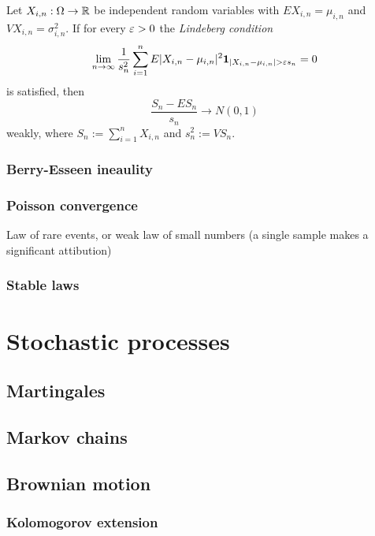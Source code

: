 \documentclass{../note}
\begin{document}
\begin{prb}
Let $X_{i,n}:\Omega\to\mathbb{R}$ be independent random variables with $EX_{i,n}=\mu_{i,n}$ and $VX_{i,n}=\sigma_{i,n}^2$.
If for every $\varepsilon>0$ the \emph{Lindeberg condition}
\[\lim_{n\to\infty}\frac1{s_n^2}\sum_{i=1}^nE|X_{i,n}-\mu_{i,n}|^2\1_{|X_{i,n}-\mu_{i,n}|>\e s_n}=0\]
is satisfied, then
\[\frac{S_n-ES_n}{s_n}\to N(0,1)\]
weakly, where $S_n:=\sum_{i=1}^nX_{i,n}$ and $s_n^2:=VS_n$.

\end{prb}


\section{Berry-Esseen ineaulity}

\section{Poisson convergence}


Law of rare events, or weak law of small numbers (a single sample makes a significant attibution)

\section{Stable laws}


\part{Stochastic processes}
\chapter{Martingales}
\chapter{Markov chains}
\chapter{Brownian motion}
\section{Kolomogorov extension}
\end{document}
